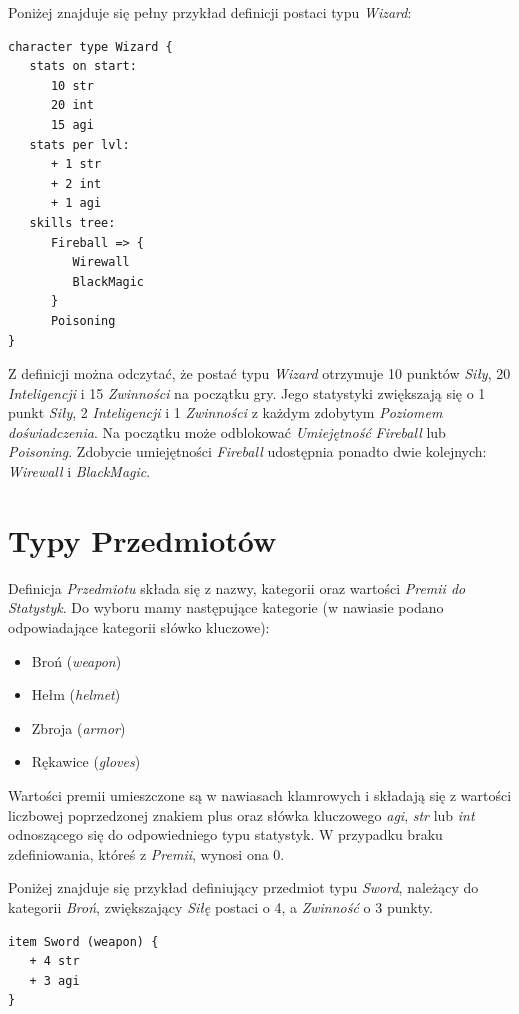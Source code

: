 \documentclass[openright]{xmgr}
\begin{document}
Poniżej znajduje się pełny przykład definicji postaci typu \textit{Wizard}:
\begin{verbatim}
character type Wizard {
   stats on start:
      10 str
      20 int
      15 agi
   stats per lvl:
      + 1 str
      + 2 int
      + 1 agi
   skills tree:
      Fireball => {
         Wirewall
         BlackMagic
      }
      Poisoning
}
\end{verbatim}
Z definicji można odczytać, że postać typu \textit{Wizard} otrzymuje 10 punktów \textit{Siły}, 20 \textit{Inteligencji} i 15 \textit{Zwinności} na początku gry.
Jego statystyki zwiększają się o 1 punkt \textit{Siły}, 2 \textit{Inteligencji} i 1 \textit{Zwinności} z każdym zdobytym \textit{Poziomem doświadczenia}.
Na początku może odblokować \textit{Umiejętność} \textit{Fireball} lub \textit{Poisoning}. Zdobycie umiejętności \textit{Fireball} udostępnia ponadto dwie kolejnych: \textit{Wirewall} i \textit{BlackMagic}. 

\section{Typy Przedmiotów}
Definicja \textit{Przedmiotu} składa się z nazwy, kategorii oraz wartości \textit{Premii do Statystyk}. Do wyboru mamy następujące kategorie (w nawiasie podano odpowiadające kategorii słówko kluczowe):
\begin{itemize}
	\item Broń (\textit{weapon})
	\item Hełm (\textit{helmet})
	\item Zbroja (\textit{armor})
	\item Rękawice (\textit{gloves})
\end{itemize}
Wartości premii umieszczone są w nawiasach klamrowych i składają się z wartości liczbowej poprzedzonej znakiem plus oraz słówka kluczowego \textit{agi}, \textit{str} lub \textit{int} odnoszącego się do odpowiedniego typu statystyk. W przypadku braku zdefiniowania, któreś z \textit{Premii}, wynosi ona 0.

Poniżej znajduje się przykład definiujący przedmiot typu \textit{Sword}, należący do kategorii \textit{Broń}, zwiększający \textit{Siłę} postaci o 4, a \textit{Zwinność} o 3 punkty.
\begin{verbatim}
item Sword (weapon) {
   + 4 str
   + 3 agi
}
\end{verbatim}
\end{document}

